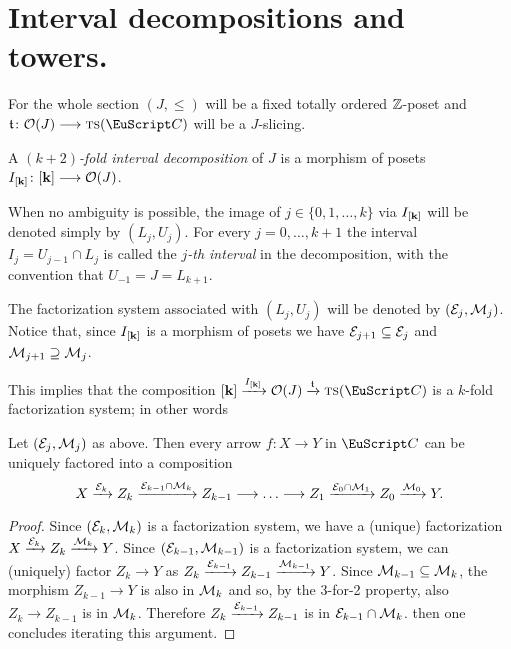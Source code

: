 \section{Interval decompositions and towers.}\label{sec:towers}
\begin{modifyepigraph}{.6}
\epigraph{}{}
\end{modifyepigraph}
\begin{remark}
For the whole section $(J,\le)$ will be a fixed totally ordered $\mathbb{Z}$-poset and $\tee\colon \O(J)\to  \ts(\C)$ will be a $J$-slicing. 
\end{remark}
\begin{definition}
A \emph{$(k+2)$-fold interval decomposition} of $J$ is a morphism of posets $I_{[\mathbf{k}]}\colon [\mathbf{k}]\longrightarrow \mathcal{O}(J)$. 
\end{definition}
\begin{notat}
When no ambiguity is possible, the image of $j\in \{0,1,\dots,k\}$ via $I_{[\mathbf{k}]}$ will be denoted simply by $(L_j,U_j)$. For every $j=0,\dots,k+1$ the interval $I_j=U_{j-1}\cap L_j$ is called the \emph{$j$-th interval} in the decomposition, with the convention that $U_{-1}=J=L_{k+1}$. %

The factorization system associated with $(L_j,U_j)$ will be denoted by $(\mathcal{E}_j,\mathcal{M}_j)$. Notice that, since $I_{[\mathbf{k}]}$ is a morphism of posets we have $\mathcal{E}_{j+1}\subseteq \mathcal{E}_j$ and $\mathcal{M}_{j+1}\supseteq \mathcal{M}_j$. 
\end{notat}
This implies that the composition $\ordk \xto{I_{\ordk}} \O(J) \xto{\tee} \ts(\C)$ is a $k$-fold factorization system; in other words
\begin{lemma}\label{k.fold.fact}
Let $(\mathcal{E}_j, \mathcal{M}_j)$ as above. Then every arrow $f\colon X\to Y$ in $\C$ can be uniquely factored into a composition
\[
X \xto{\E_{k}} Z_{k} \xto{\E_{k-1}\cap \M_{k}} Z_{k-1}\to\dots\to Z_{1} \xto{\E_{0}\cap \M_{1}} Z_{0} \xto{\M_{0}} Y.
\]
\end{lemma}
\begin{proof}
Since $(\mathcal{E}_k,\mathcal{M}_k)$ is a factorization system, we have a (unique) factorization $X \xrightarrow{\mathcal{E}_{k}} Z_{k} \xrightarrow{\mathcal{M}_{k}} Y$.  Since $(\mathcal{E}_{k-1},\mathcal{M}_{k-1})$ is a factorization system, we can (uniquely) factor $Z_k\to Y$ as $Z_k \xrightarrow{\mathcal{E}_{k-1}} Z_{k-1} \xrightarrow{\mathcal{M}_{k-1}} Y$. Since $\mathcal{M}_{k-1}\subseteq \mathcal{M}_k$, the morphism $Z_{k-1} \to Y$ is also in $\mathcal{M}_k$ and so, by the 3-for-2 property, also $Z_k \to Z_{k-1}$ is in $\mathcal{M}_k$. Therefore $Z_k \xrightarrow{\mathcal{E}_{k-1}} Z_{k-1}$ is in $\mathcal{E}_{k-1}\cap \mathcal{M}_k$. then one concludes iterating this argument.
\end{proof}
